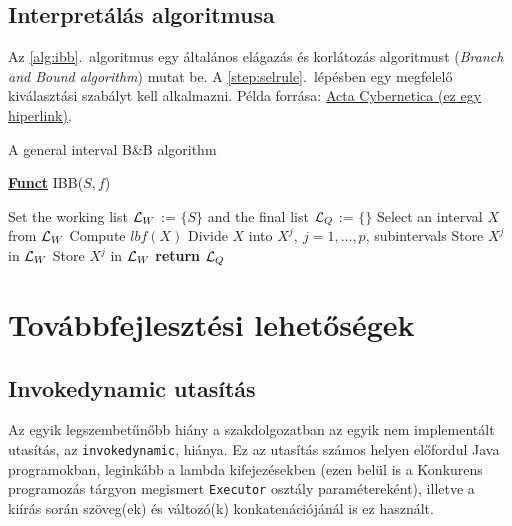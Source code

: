 \subsection{Interpretálás algoritmusa}

Az \ref{alg:ibb}.~algoritmus egy általános elágazás és korlátozás algoritmust (\emph{Branch and Bound algorithm}) mutat be. A \ref{step:selrule}.~lépésben egy megfelelő kiválasztási szabályt kell alkalmazni.
Példa forrása: \href{https://www.inf.u-szeged.hu/actacybernetica/}{Acta Cybernetica (ez egy hiperlink)}.

\begin{algorithm}[H]
\caption{A general interval B\&B algorithm}
\label{alg:ibb}
\textbf{\underline{Funct}} IBB($S,f$)
\begin{algorithmic}[1] %
\State Set the working list ${\cal L}_W$ := $\{S\}$ and the final list ${\cal L}_Q$ := $\{\}$
 \label{alg:igoend}
	\State Select an interval $X$ from ${\cal L}_W$ \label{step:selrule}
	\State Compute $lbf(X)$ 
	 
		\State Divide $X$ into $X^j,\ j=1,\dots, p$, subintervals   
			 
				\State Store $X^j$ in ${\cal L}_W$
			\Else
				\State Store $X^j$ in ${\cal L}_W$
			\EndIf
		\EndFor
	\EndIf
\EndWhile
\State \textbf{return} ${\cal L}_Q$
\end{algorithmic}
\end{algorithm}

\section{Továbbfejlesztési lehetőségek}

\subsection{Invokedynamic utasítás}

Az egyik legszembetűnőbb hiány a szakdolgozatban az egyik nem implementált utasítás, az \lstinline{invokedynamic}, hiánya.
Ez az utasítás számos helyen előfordul Java programokban, leginkább a lambda kifejezésekben (ezen belül is a Konkurens programozás tárgyon megismert \lstinline{Executor} osztály paramétereként), illetve a kiírás során szöveg(ek) és változó(k) konkatenációjánál is ez használt.

